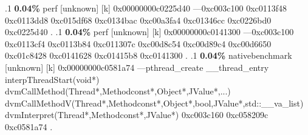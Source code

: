 \begin{profile}
{.1 \textbf{ 0.04\%} perf             [unknown]              [k] 0x00000000c0225d40\newline {} ---0xc003c100\newline {} 0xc0113f48\newline {} 0xc0113dd8\newline {} 0xc015df68\newline {} 0xc0134bac\newline {} 0xc00a3fa4\newline {} 0xc01346cc\newline {} 0xc0226bd0\newline {} 0xc0225d40\newline {} . 
.1 \textbf{ 0.04\%} perf             [unknown]              [k] 0x00000000c0141300\newline {} ---0xc003c100\newline {} 0xc0113cf4\newline {} 0xc0113b84\newline {} 0xc011307c\newline {} 0xc00d8c54\newline {} 0xc00d89c4\newline {} 0xc00d6650\newline {} 0xc01c8428\newline {} 0xc0141628\newline {} 0xc01415b8\newline {} 0xc0141300\newline {} . 
.1 \textbf{ 0.04\%} nativebenchmark  [unknown]              [k] 0x00000000c0581a74\newline {} ---pthread\_create\newline {} \_\_thread\_entry\newline {} interpThreadStart(void*)\newline {} dvmCallMethod(Thread*,Methodconst*,Object*,JValue*,...)\newline {} dvmCallMethodV(Thread*,Methodconst*,Object*,bool,JValue*,std::\_\_va\_list)\newline {} dvmInterpret(Thread*,Methodconst*,JValue*)\newline {} 0xc003c160\newline {} 0xc058209c\newline {} 0xc0581a74\newline {} . 
}
\end{profile}
